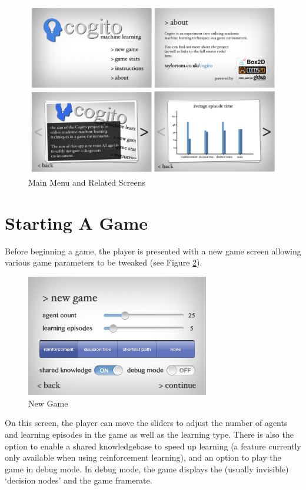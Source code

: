\documentclass[a4paper,oneside]{report}
\begin{document}
\begin{figure}[h!]
  \centering
    \includegraphics[width=120mm]{sources/images/FinalScreens}
    \caption{Main Menu and Related Screens}
    \label{fig:FinalScreens}
\end{figure}

\section{Starting A Game}

Before beginning a game, the player is presented with a new game screen allowing various game parameters to be tweaked (see Figure \ref{fig:NewGame}).

\begin{figure}[h!]
  \centering
    \includegraphics[width=80mm]{sources/images/Screen_NewGame}
    \caption{New Game}
    \label{fig:NewGame}
\end{figure}

On this screen, the player can move the sliders to adjust the number of agents and learning episodes in the game as well as the learning type. There is also the option to enable a shared knowledgebase to speed up learning (a feature currently only available when using reinforcement learning), and an option to play the game in debug mode. In debug mode, the game displays the (usually invisible) `decision nodes' and the game framerate.
\end{document}
